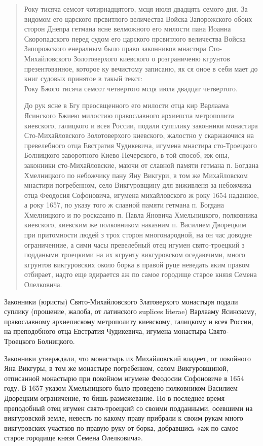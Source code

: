 \begin{quotation}
Року тисяча семсот чотирнадцятого, мсця июля двадцять семого дня. За видомом его царского прсвитлого величества Войска Запорожского обоих сторон Днепра гетмана ясне велможного его милости пана Иоанна Скоропадского перед судом его царского прсвитлого величества Войска Запорожского енералным было право законников мнастира Сто-Михайловс\-кого Золотоверхого киевского о розграниченю кгрунтов презентованное, которое ку вечистому записаню, як ся оное в себи мает до книг судовых принятое в такый текст:\\

Року Бжого тисяча семсот четвертого мсця июля двадцат четвертого.

До рук ясне в Бгу преосвщенного его милости отца кир Варлаама Ясинского Бжиею милостию православного архиепспа метрополита киевского, галицкого и всея России, подали супплику законники монастира Сто-Михайловс\-кого Золотоверхого киевского, жалостно у скар\-жаючися на превелебного отца Евстратия Чудикевича, игумена мнастира сто-Троецкого Болницкого заворотного Киево-Печерско\-го, в той способ, иж оны, законники сто-Михайловские, маючи от славной памяти гетмана п. Богдана Хмелницкого по небожчику пану Яну Викгури, в том же Михайловском мнастири погребенном, село Викгуровщину для виживленя за небожчика отца Феодосия Софоновича, игумена михайловского ж року 1654 наданное, а року 1657, по указу того ж славной памяти гетмана п. Богдана Хмелницкого и по росказаню п. Павла Яновича Хмельницкого, полковника киевского, киевским же полковником наказним п. Василием Дворецким при притомности людей з трох сторон многонародной, на он час доводне ограниченние, а сими часы превелебный отец игумен свято-троецкий з поддаными троецкими на их кгрунту викгуровском оседаючими, много кгрунтов викгуровских около борка в правой руце неведать яким правом отбирает, надто еще вдирается аж по самое городище старое князя Семена Олелковича.
\end{quotation}

Законники (юристы) Свято-Михайловского Златоверхого монастыря подали суплику (прошение, жалоба, от латинского suplices literae) Варлааму Ясинскому, православному архиепискому метрополиту киевскому, галицкому и всея России, на  преподобного отца Евстратия Чудикевича, игумена монастыра Свято-Троецкого Болницкого.

Законники утверждали, что монастырь их Михайловский владеет, от покойного Яна Викгуры, в том же монастыре погребенном, селом Викгуровщиной, отписанной монастырю при покойном игумене Феодосии Софоновиче в 1654 году. В 1657 указом Хмельницкого было проведено полковником Василием Дворецким ограничение, то бишь размежевание. Но в последнее время преподобный отец игумен свято-троецкий со своими подданными, осевшими на викгуровской земле, невесть по какому праву прибрали к своим рукам много викгуровских участков по правую руку от борка, добравшись «аж по самое старое городище князя Семена Олелковича».

